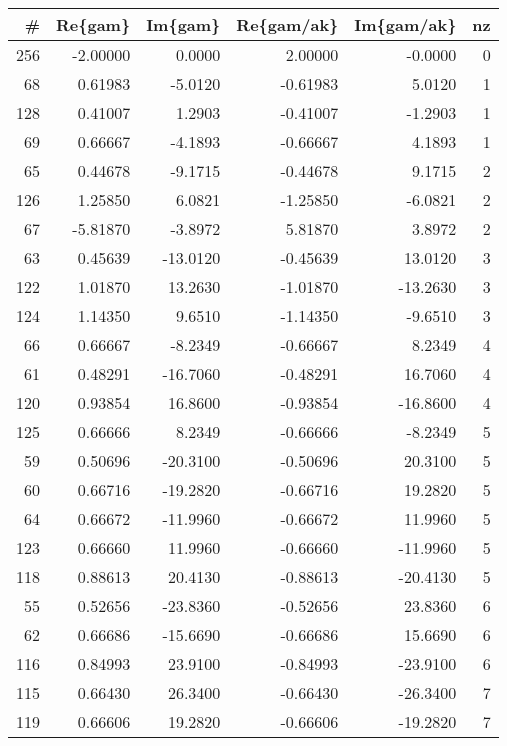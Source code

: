 \small \begin{tabular}{rrrrrr}
\toprule
  \# &  Re\{gam\} &  Im\{gam\} &  Re\{gam/ak\} &  Im\{gam/ak\} &  nz \\
\midrule
256 & -2.00000 &   0.0000 &     2.00000 &     -0.0000 &   0 \\
 68 &  0.61983 &  -5.0120 &    -0.61983 &      5.0120 &   1 \\
128 &  0.41007 &   1.2903 &    -0.41007 &     -1.2903 &   1 \\
 69 &  0.66667 &  -4.1893 &    -0.66667 &      4.1893 &   1 \\
 65 &  0.44678 &  -9.1715 &    -0.44678 &      9.1715 &   2 \\
126 &  1.25850 &   6.0821 &    -1.25850 &     -6.0821 &   2 \\
 67 & -5.81870 &  -3.8972 &     5.81870 &      3.8972 &   2 \\
 63 &  0.45639 & -13.0120 &    -0.45639 &     13.0120 &   3 \\
122 &  1.01870 &  13.2630 &    -1.01870 &    -13.2630 &   3 \\
124 &  1.14350 &   9.6510 &    -1.14350 &     -9.6510 &   3 \\
 66 &  0.66667 &  -8.2349 &    -0.66667 &      8.2349 &   4 \\
 61 &  0.48291 & -16.7060 &    -0.48291 &     16.7060 &   4 \\
120 &  0.93854 &  16.8600 &    -0.93854 &    -16.8600 &   4 \\
125 &  0.66666 &   8.2349 &    -0.66666 &     -8.2349 &   5 \\
 59 &  0.50696 & -20.3100 &    -0.50696 &     20.3100 &   5 \\
 60 &  0.66716 & -19.2820 &    -0.66716 &     19.2820 &   5 \\
 64 &  0.66672 & -11.9960 &    -0.66672 &     11.9960 &   5 \\
123 &  0.66660 &  11.9960 &    -0.66660 &    -11.9960 &   5 \\
118 &  0.88613 &  20.4130 &    -0.88613 &    -20.4130 &   5 \\
 55 &  0.52656 & -23.8360 &    -0.52656 &     23.8360 &   6 \\
 62 &  0.66686 & -15.6690 &    -0.66686 &     15.6690 &   6 \\
116 &  0.84993 &  23.9100 &    -0.84993 &    -23.9100 &   6 \\
115 &  0.66430 &  26.3400 &    -0.66430 &    -26.3400 &   7 \\
119 &  0.66606 &  19.2820 &    -0.66606 &    -19.2820 &   7 \\

\end{tabular}
